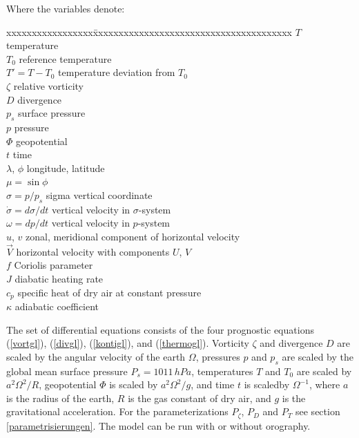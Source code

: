 Where the variables denote:
\begin{tabbing}
xxxxxxxxxxxxxxxxx\=xxxxxxxxxxxxxxxxxxxxxxxxxxxxxxxxxxxxxxx\kill
$T$ \> temperature \\
$T_0$ \> reference temperature \\
$T'=T-T_0$ \> temperature deviation from $T_0$ \\
$\zeta$ \> relative vorticity \\
$D$ \> divergence \\
$p_s$ \> surface pressure \\
$p$ \> pressure \\
$\Phi$ \> geopotential \\
$t$ \> time \\
$\lambda$, $\phi$ \> longitude, latitude \\
$\mu=\sin\phi$ \> \\
$\sigma=p/p_s$ \> sigma vertical coordinate \\
$\dot{\sigma}=d\sigma/dt$ \> vertical velocity in $\sigma$-system \\
$\omega=dp/dt$ \> vertical velocity in $p$-system \\
$u$, $v$ \> zonal, meridional component of horizontal velocity \\
$\vec{V}$ \> horizontal velocity with components $U$, $V$ \\
$f$ \> Coriolis parameter \\
$J$ \> diabatic heating rate \\
$c_p$ \> specific heat of dry air at constant pressure \\
$\kappa$ \> adiabatic coefficient \\
\end{tabbing}
The set of differential equations consists of the four prognostic
equations (\ref{vortgl}), (\ref{divgl}), (\ref{kontigl}), and
(\ref{thermogl}). Vorticity $\zeta$ and divergence $D$ are
scaled by the angular velocity of the earth $\Omega$, pressures $p$
and $p_s$ are scaled by the global mean surface pressure $P_s=1011\,hPa$,
temperatures $T$ and $T_0$ are scaled by $a^2\Omega^2/R$, geopotential
$\Phi$ is scaled by $a^2\Omega^2/g$, and time $t$ is scaledby $\Omega^{-1}$, where
$a$ is the radius of the earth, $R$ is the gas constant of dry air,
and $g$ is the gravitational acceleration.
For the parameterizations $P_\zeta$, $P_D$ and $P_T$ see section
\ref{parametrisierungen}. The model can be run with or without orography.

